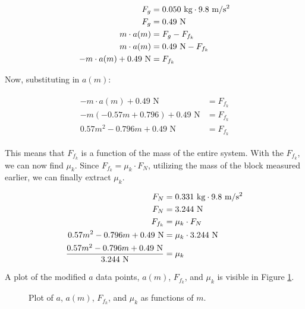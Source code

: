 \documentclass[12pt]{article}
\begin{document}
\begin{align}
    \begin{split}
        F_g &= 0.050 \text{ kg} \cdot 9.8 \text{ m/s\textsuperscript{2}} \\
        F_g &= 0.49 \text{ N} \\
        m \cdot a(m) &= F_g - F_{f_k} \\
        m \cdot a(m) &= 0.49 \text{ N} - F_{f_k} \\
        -m \cdot a(m) + 0.49 \text{ N} &= F_{f_k}
    \end{split}
\end{align}

Now, substituting in $a(m)$:

\begin{align}
    \begin{split}
        -m \cdot a(m) + 0.49 \text{ N} &= F_{f_k} \\
        -m(-0.57m + 0.796) + 0.49 \text{ N} &= F_{f_k} \\
        0.57m^2 - 0.796m + 0.49 \text{ N} &= F_{f_k}
    \end{split}
\end{align}

This means that $F_{f_k}$ is a function of the mass of the entire system. With
the $F_{f_k}$, we can now find $\mu_k$. Since $F_{f_k} = \mu_k \cdot F_N$,
utilizing the mass of the block measured earlier, we can finally extract
$\mu_k$.

\begin{align}
    \begin{split}
        F_N &= 0.331 \text{ kg} \cdot 9.8 \text{ m/s\textsuperscript{2}} \\
        F_N &= 3.244 \text{ N} \\
        F_{f_k} &= \mu_k \cdot F_N \\
        0.57m^2 - 0.796m + 0.49 \text{ N} &= \mu_k \cdot 3.244 \text{ N} \\
        \frac{0.57m^2 - 0.796m + 0.49 \text{ N}}{3.244 \text{ N}} &= \mu_k
    \end{split}
\end{align}

A plot of the modified $a$ data points, $a(m)$, $F_{f_k}$, and $\mu_k$ is visible in Figure
\ref{fig:compilation}.

\begin{figure}[H]
    \centering
    \caption{Plot of $a$, $a(m)$, $F_{f_k}$, and $\mu_k$ as functions of $m$.}
    \label{fig:compilation}
\end{figure}
\end{document}
